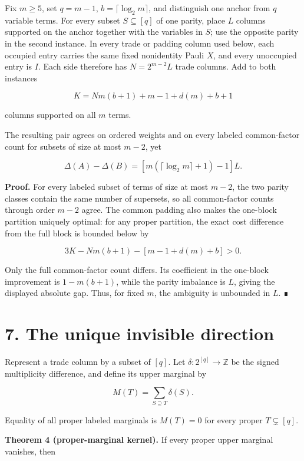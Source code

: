 \documentclass[
  11pt,
]{article}
\begin{document}
Fix \(m\ge5\), set \(q=m-1\), \(b=\lceil\log_2m\rceil\), and distinguish
one anchor from \(q\) variable terms. For every subset \(S\subseteq[q]\)
of one parity, place \(L\) columns supported on the anchor together with
the variables in \(S\); use the opposite parity in the second instance.
In every trade or padding column used below, each occupied entry carries
the same fixed nonidentity Pauli \(X\), and every unoccupied entry is
\(I\). Each side therefore has \(N=2^{m-2}L\) trade columns. Add to both
instances

\[
K=Nm(b+1)+m-1+d(m)+b+1
\]

columns supported on all \(m\) terms.

The resulting pair agrees on ordered weights and on every labeled
common-factor count for subsets of size at most \(m-2\), yet

\[
\Delta(A)-\Delta(B)
=\left[m(\lceil\log_2m\rceil+1)-1\right]L.
\]

\textbf{Proof.} For every labeled subset of terms of size at most
\(m-2\), the two parity classes contain the same number of supersets, so
all common-factor counts through order \(m-2\) agree. The common padding
also makes the one-block partition uniquely optimal: for any proper
partition, the exact cost difference from the full block is bounded
below by

\[
3K-Nm(b+1)-[m-1+d(m)+b]>0.
\]

Only the full common-factor count differs. Its coefficient in the
one-block improvement is \(1-m(b+1)\), while the parity imbalance is
\(L\), giving the displayed absolute gap. Thus, for fixed \(m\), the
ambiguity is unbounded in \(L\). ∎

\hypertarget{the-unique-invisible-direction}{%
\section{7. The unique invisible
direction}\label{the-unique-invisible-direction}}

Represent a trade column by a subset of \([q]\). Let
\(\delta:2^{[q]}\to\mathbb Z\) be the signed multiplicity difference,
and define its upper marginal by

\[
M(T)=\sum_{S\supseteq T}\delta(S).
\]

Equality of all proper labeled marginals is \(M(T)=0\) for every proper
\(T\subsetneq[q]\).

\textbf{Theorem 4 (proper-marginal kernel).} If every proper upper
marginal vanishes, then
\end{document}
